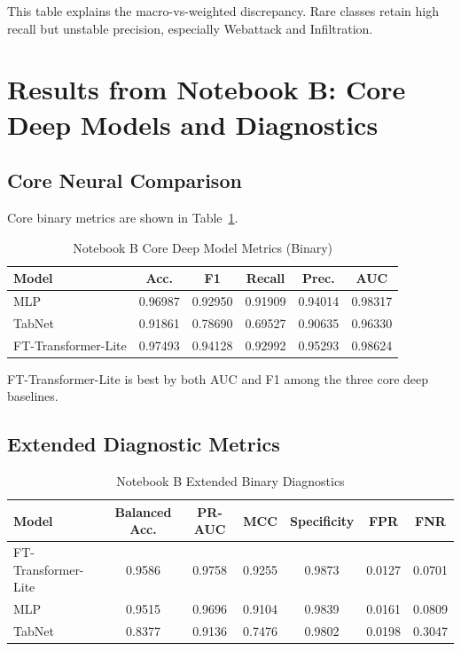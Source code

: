 \documentclass[10pt,journal]{IEEEtran}
\begin{document}
This table explains the macro-vs-weighted discrepancy. Rare classes retain high recall but unstable precision, especially Webattack and Infiltration.

\section{Results from Notebook B: Core Deep Models and Diagnostics}
\subsection{Core Neural Comparison}
Core binary metrics are shown in Table~\ref{tab:dl_core}.

\begin{table}[!t]
\caption{Notebook B Core Deep Model Metrics (Binary)}
\label{tab:dl_core}
\centering
\begin{tabular}{lccccc}
\toprule
Model & Acc. & F1 & Recall & Prec. & AUC \\
\midrule
MLP & 0.96987 & 0.92950 & 0.91909 & 0.94014 & 0.98317 \\
TabNet & 0.91861 & 0.78690 & 0.69527 & 0.90635 & 0.96330 \\
FT-Transformer-Lite & 0.97493 & 0.94128 & 0.92992 & 0.95293 & 0.98624 \\
\bottomrule
\end{tabular}
\end{table}

FT-Transformer-Lite is best by both AUC and F1 among the three core deep baselines.

\subsection{Extended Diagnostic Metrics}
\begin{table}[!t]
\caption{Notebook B Extended Binary Diagnostics}
\label{tab:dl_extended}
\centering
\begin{tabular}{lcccccc}
\toprule
Model & Balanced Acc. & PR-AUC & MCC & Specificity & FPR & FNR \\
\midrule
FT-Transformer-Lite & 0.9586 & 0.9758 & 0.9255 & 0.9873 & 0.0127 & 0.0701 \\
MLP & 0.9515 & 0.9696 & 0.9104 & 0.9839 & 0.0161 & 0.0809 \\
TabNet & 0.8377 & 0.9136 & 0.7476 & 0.9802 & 0.0198 & 0.3047 \\
\bottomrule
\end{tabular}
\end{table}
\end{document}
